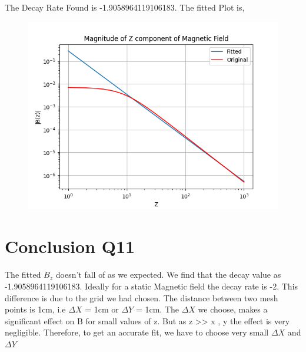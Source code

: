 \documentclass[12pt, a4paper]{report}
\begin{document}
The Decay Rate Found is -1.9058964119106183. The fitted Plot is,
\begin{figure}[h!]
    \centering
    \includegraphics[scale=0.7]{fig3.png} 
    \caption{}
    \label{fig:my_label}
\end{figure}
\vspace{100mm}

\section{Conclusion Q11}
The fitted $B_z$ doesn’t fall of as we expected. We find that the decay value as -1.9058964119106183. Ideally for a static Magnetic field the decay rate is -2. This difference is due to the grid we had chosen. The distance between two mesh points is 1cm, i.e $\Delta X$ = 1cm or $\Delta Y$ = 1cm. The $\Delta X$ we choose, makes a significant effect on B for small values of z. But as z >> x , y the effect is very negligible. Therefore, to get an accurate fit, we have to choose very small $\Delta X$ and $\Delta Y$
\end{document}
